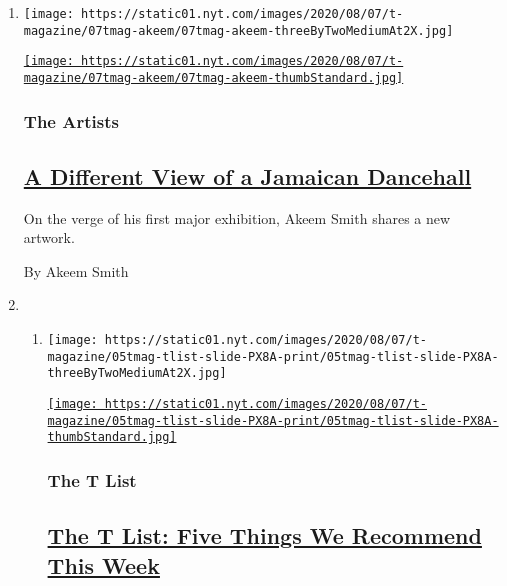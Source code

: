 \begin{enumerate}
\def\labelenumi{\arabic{enumi}.}
\item
  \texttt{[image: https://static01.nyt.com/images/2020/08/07/t-magazine/07tmag-akeem/07tmag-akeem-threeByTwoMediumAt2X.jpg]}

  \href{/2020/08/07/t-magazine/akeem-smith-art.html}{\texttt{[image: https://static01.nyt.com/images/2020/08/07/t-magazine/07tmag-akeem/07tmag-akeem-thumbStandard.jpg]}}

  \hypertarget{the-artists}{%
  \subsubsection{The Artists}\label{the-artists}}

  \hypertarget{a-different-view-of-a-jamaican-dancehall}{%
  \subsection{\texorpdfstring{\href{/2020/08/07/t-magazine/akeem-smith-art.html}{A
  Different View of a Jamaican
  Dancehall}}{A Different View of a Jamaican Dancehall}}\label{a-different-view-of-a-jamaican-dancehall}}

  On the verge of his first major exhibition, Akeem Smith shares a new
  artwork.

  By Akeem Smith
\item
  \begin{enumerate}
  \def\labelenumii{\arabic{enumii}.}
  \item
    \texttt{[image: https://static01.nyt.com/images/2020/08/07/t-magazine/05tmag-tlist-slide-PX8A-print/05tmag-tlist-slide-PX8A-threeByTwoMediumAt2X.jpg]}

    \href{/2020/08/06/t-magazine/t-list-toyin-ojih-odutola.html}{\texttt{[image: https://static01.nyt.com/images/2020/08/07/t-magazine/05tmag-tlist-slide-PX8A-print/05tmag-tlist-slide-PX8A-thumbStandard.jpg]}}

    \hypertarget{the-t-list}{%
    \subsubsection{The T List}\label{the-t-list}}

    \hypertarget{the-t-list-five-things-we-recommend-this-week}{%
    \subsection{\texorpdfstring{\href{/2020/08/06/t-magazine/t-list-toyin-ojih-odutola.html}{The
    T List: Five Things We Recommend This
    Week}}{The T List: Five Things We Recommend This Week}}\label{the-t-list-five-things-we-recommend-this-week}}


\end{enumerate}
\end{enumerate}
